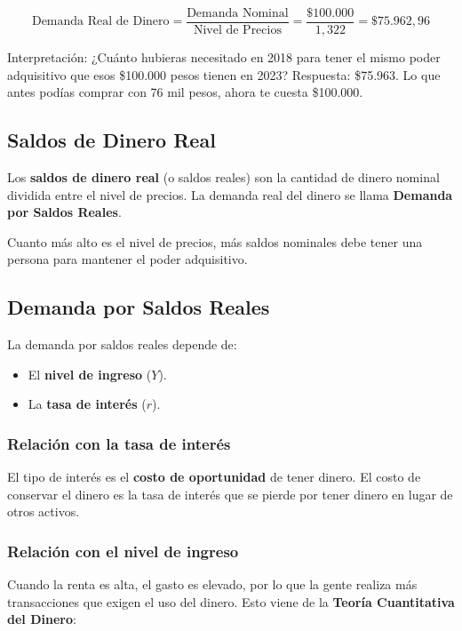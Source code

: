 \documentclass[11pt,a4paper]{article}
\begin{document}
\[
\text{Demanda Real de Dinero} = \frac{\text{Demanda Nominal}}{\text{Nivel de Precios}} = \frac{\$100.000}{1{,}322} = \$75.962{,}96
\]

Interpretación: ¿Cuánto hubieras necesitado en 2018 para tener el mismo poder adquisitivo que esos \$100.000 pesos tienen en 2023? Respuesta: \$75.963. Lo que antes podías comprar con 76 mil pesos, ahora te cuesta \$100.000.

\subsection{Saldos de Dinero Real}

\begin{definicionbox}
Los \textbf{saldos de dinero real} (o saldos reales) son la cantidad de dinero nominal dividida entre el nivel de precios. La demanda real del dinero se llama \textbf{Demanda por Saldos Reales}.
\end{definicionbox}

Cuanto más alto es el nivel de precios, más saldos nominales debe tener una persona para mantener el poder adquisitivo.

\subsection{Demanda por Saldos Reales}

La demanda por saldos reales depende de:
\begin{itemize}
    \item El \textbf{nivel de ingreso} ($Y$).
    \item La \textbf{tasa de interés} ($r$).
\end{itemize}

\subsubsection{Relación con la tasa de interés}

El tipo de interés es el \textbf{costo de oportunidad} de tener dinero. El costo de conservar el dinero es la tasa de interés que se pierde por tener dinero en lugar de otros activos.

\subsubsection{Relación con el nivel de ingreso}

Cuando la renta es alta, el gasto es elevado, por lo que la gente realiza más transacciones que exigen el uso del dinero. Esto viene de la \textbf{Teoría Cuantitativa del Dinero}:
\end{document}
